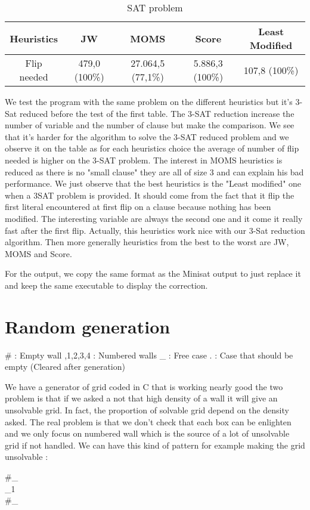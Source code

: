 \documentclass[a4paper]{article}
\begin{document}
\begin{table}[h!]
\begin{center}
\begin{tabular}{c||c c c c}
         Heuristics & JW  & MOMS  & Score  & Least Modified  \\
        \hline
        \hline
         Flip needed & 479,0 (100\%) & 27.064,5 (77,1\%) & 5.886,3 (100\%)  & 107,8 (100\%)\\

\end{tabular}
\caption{SAT problem}
\end{center}
\end{table}


We test the program with the same problem on the different heuristics but it's 3-Sat reduced before the test of the first table. The 3-SAT reduction increase the number of variable and the number of clause but make the comparison. We see that it's harder for the algorithm to solve the 3-SAT reduced problem and we observe it on the table as for each heuristics choice the average of number of flip needed is higher on the 3-SAT problem. The interest in MOMS heuristics is reduced as there is no "small clause" they are all of size 3 and can explain his bad performance.
We just observe that the best heuristics is the "Least modified" one when a 3SAT problem is provided. It should come from the fact that it flip the first literal encountered at first flip on a clause because nothing has been modified. The interesting variable are always the second one and it come it really fast after the first flip. Actually, this heuristics work nice with our 3-Sat reduction algorithm. Then more generally heuristics from the best to the worst are JW, MOMS and Score.

\medskip

For the output, we copy the same format as the Minisat output to just replace it and keep the same executable to display the correction.

\newpage

\section{Random generation}
\begin{center}
 \# : Empty wall ,1,2,3,4 : Numbered walls  \newline \_ : Free case \qquad   . : Case that should be empty (Cleared after generation)
\end{center}
We have a generator of grid coded in C that is working nearly good the two problem is that if we asked a not that high density of a wall it will give an unsolvable grid. In fact, the proportion of solvable grid depend on the density asked. The real problem is that we don't check that each box can be enlighten and we only focus on numbered wall which is the source of a lot of unsolvable grid if not handled. We can have this kind of pattern for example making the grid unsolvable :
\begin{center}
\#\_ \\
\_1 \\
\#\_ \\
\end{center}
\end{document}
